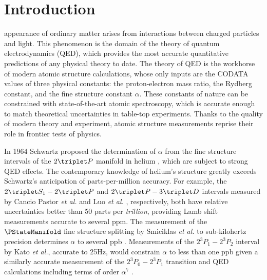 
\section{Introduction}

   appearance of ordinary matter arises from interactions between charged particles and light. This phenomenon is the domain of the theory of quantum electrodynamics (QED), which provides the most accurate quantitative predictions of any physical theory to date. The theory of QED is the workhorse of modern atomic structure calculations, whose only inputs are the CODATA values of three physical constants: the proton-electron mass ratio, the Rydberg constant, and the fine structure constant $\alpha$. These constants of nature can be constrained with state-of-the-art atomic spectroscopy, which is accurate enough to match theoretical uncertainties in table-top experiments. Thanks to the quality of modern theory and experiment, atomic structure measurements reprise their role in frontier tests of physics. 

  In 1964 Schwartz proposed the determination of $\alpha$ from the fine structure intervals of the $2\triplet P$ manifold in helium \cite{Schwartz64}, which are subject to strong QED effects. The contemporary knowledge of helium's structure greatly exceeds Schwartz's anticipation of parts-per-million accuracy. For example, the $2\triplet S_1 - 2\triplet P$ and $2\triplet P - 3\triplet D$ intervals measured by Cancio Pastor \textit{et al.} \cite{Pastor04} and Luo \emph{et al.} \cite{Luo16}, respectively, both have relative uncertainties better than 50 parts per \emph{trillion}, providing Lamb shift measurements accurate to several ppm. The measurement of the $\PStateManifold$ fine structure splitting by Smiciklas \textit{et al.} to sub-kilohertz precision determines $\alpha$ to several ppb \cite{Smiciklas10}. Measurements of the $2^{3\!}P_1-2^{3\!}P_2$ interval by Kato \emph{et al.}, accurate to 25Hz, would constrain $\alpha$ to less than one ppb given a similarly accurate measurement of the $2^{3\!}P_0 - 2^{3\!}P_1$ transition and QED calculations including terms of order $\alpha^7$ \cite{Kato18}. 

